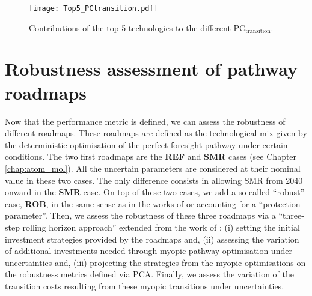 \begin{figure}[!htbp]
\centering
\texttt{[image: Top5\_PCtransition.pdf]}
\caption{Contributions of the top-5 technologies to the different $\text{PC}_{\text{transition}}$. }
\label{fig:Top5_PC_transition}
\end{figure}

\newpage
\section{Robustness assessment of pathway roadmaps}
\label{sec:RobPol:Rob_Assessment}
Now that the performance metric is defined, we can assess the robustness of different roadmaps. These roadmaps are defined as the technological mix given by the deterministic optimisation of the perfect foresight pathway under certain conditions. The two first roadmaps are the \textbf{REF} and \textbf{SMR} cases (see Chapter \ref{chap:atom_mol}). All the uncertain parameters are considered at their nominal value in these two cases. The only difference consists in allowing \gls{SMR} from 2040 onward in the \textbf{SMR} case. On top of these two cases, we add a so-called ``robust'' case, \textbf{ROB}, in the same sense as in the works of \citet{bertsimas2004price} or \citet{Moret2017PhDThesis} accounting for a ``protection parameter''. Then, we assess the robustness of these three roadmaps via a ``three-step rolling horizon approach'' extended from the work of \citet{moret2020overcapacity}: (i) setting the initial investment strategies provided by the roadmaps and, (ii) assessing the variation of additional investments needed through myopic pathway optimisation under uncertainties and, (iii) projecting the strategies from the myopic optimisations on the robustness metrics defined via \gls{PCA}. Finally, we assess the variation of the transition costs resulting from these myopic transitions under uncertainties.


